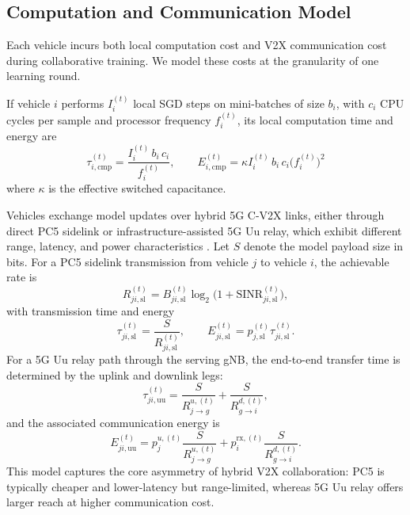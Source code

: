
\subsection{Computation and Communication Model}

Each vehicle incurs both local computation cost and V2X communication cost during collaborative training. We model these costs at the granularity of
one learning round.

If vehicle $i$ performs $I_i^{(t)}$ local SGD steps on mini-batches of size $b_i$, with $c_i$ CPU cycles per sample and processor frequency
$f_i^{(t)}$, its local computation time and energy are
%
\begin{equation*}
    \tau_{i,\mathrm{cmp}}^{(t)} = \frac{I_i^{(t)}\, b_i\, c_i}{f_i^{(t)}},
    \qquad
    E_{i,\mathrm{cmp}}^{(t)} = \kappa I_i^{(t)}\, b_i\, c_i \bigl(f_i^{(t)}\bigr)^2
\end{equation*}
%
where $\kappa$ is the effective switched capacitance.

Vehicles exchange model updates over hybrid 5G C-V2X links, either through direct PC5 sidelink or infrastructure-assisted 5G Uu relay, which exhibit
different range, latency, and power characteristics \cite{garcia2021tutorial,molina2017ltev,3gpp2021architecture}. Let $S$ denote the model payload size in bits. For a PC5 sidelink transmission from vehicle $j$ to vehicle $i$, the achievable rate is
%
\begin{equation*}
    R_{ji,\mathrm{sl}}^{(t)} = B_{ji,\mathrm{sl}}^{(t)} \log_2\!\bigl(1+\mathrm{SINR}_{ji,\mathrm{sl}}^{(t)}\bigr),
\end{equation*}
%
with transmission time and energy
%
\begin{equation*}
    \tau_{ji,\mathrm{sl}}^{(t)}=\frac{S}{R_{ji,\mathrm{sl}}^{(t)}},
    \qquad
    E_{ji,\mathrm{sl}}^{(t)}=p_{j,\mathrm{sl}}^{(t)}\tau_{ji,\mathrm{sl}}^{(t)}.
\end{equation*}
%
For a 5G Uu relay path through the serving gNB, the end-to-end transfer time is determined by the uplink and downlink legs:
\begin{equation*}
    \tau_{ji,\mathrm{uu}}^{(t)} = \frac{S}{R_{j\rightarrow g}^{u,(t)}} + \frac{S}{R_{g\rightarrow i}^{d,(t)}},
\end{equation*}
%
and the associated communication energy is
%
\begin{equation*}
    E_{ji,\mathrm{uu}}^{(t)} = p_j^{u,(t)}\frac{S}{R_{j\rightarrow g}^{u,(t)}} + p_i^{\mathrm{rx},(t)}\frac{S}{R_{g\rightarrow i}^{d,(t)}}.
\end{equation*}
%
This model captures the core asymmetry of hybrid V2X collaboration: PC5 is typically cheaper and lower-latency but range-limited, whereas 5G Uu relay
offers larger reach at higher communication cost.


